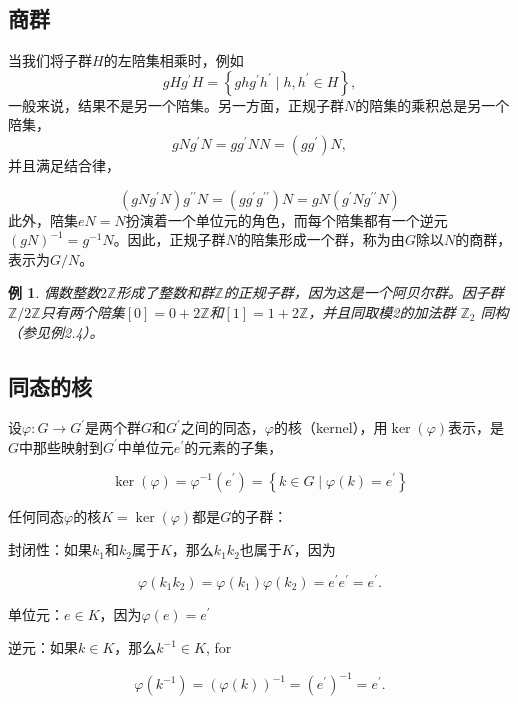 \documentclass[hyperref,UTF8]{ctexbook}
\newtheorem{eg}{例}[chapter]
\begin{document}
\subsection{商群}
当我们将子群$H$的左陪集相乘时，例如
$$
g H g^{\prime} H=\left\{g h g^{\prime} h^{\prime} \mid h, h^{\prime} \in H\right\},
$$
一般来说，结果不是另一个陪集。另一方面，正规子群$N$的陪集的乘积总是另一个陪集，
$$
g N g^{\prime} N=g g^{\prime} N N=\left(g g^{\prime}\right) N,
$$
并且满足结合律，

$$
\left(g N g^{\prime} N\right) g^{\prime \prime} N=\left(g g^{\prime} g^{\prime \prime}\right) N=g N\left(g^{\prime} N g^{\prime \prime} N\right)
$$
此外，陪集$e N=N$扮演着一个单位元的角色，而每个陪集都有一个逆元 $(g N)^{-1}=g^{-1} N$。因此，正规子群$N$的陪集形成一个群，称为由$G$除以$N$的商群，表示为$G / N$。
\begin{eg}
    偶数整数$2 \mathbb{Z}$形成了整数和群$\mathbb{Z}$的正规子群，因为这是一个阿贝尔群。因子群$\mathbb{Z} / 2 \mathbb{Z}$只有两个陪集$[0]=0+2 \mathbb{Z}$和$[1]=1+2 \mathbb{Z}$，并且同取模2的加法群 $\mathbb{Z}_{2}$  同构（参见例2.4）。
\end{eg}

\subsection{同态的核}
设$\varphi: G \rightarrow G^{\prime}$是两个群$G$和$G^{\prime}$之间的同态，$\varphi$的核（kernel），用$\operatorname{ker}(\varphi)$表示，是$G$中那些映射到$G^{\prime}$中单位元$e^{\prime}$的元素的子集，

$$
\operatorname{ker}(\varphi)=\varphi^{-1}\left(e^{\prime}\right)=\left\{k \in G \mid \varphi(k)=e^{\prime}\right\}
$$

任何同态$\varphi$的核$K=\operatorname{ker}(\varphi)$都是$G$的子群：

封闭性：如果$k_{1}$和$k_{2}$属于$K$，那么$k_{1} k_{2}$也属于$K$，因为

$$
\varphi\left(k_{1} k_{2}\right)=\varphi\left(k_{1}\right) \varphi\left(k_{2}\right)=e^{\prime} e^{\prime}=e^{\prime} .
$$

单位元：$e \in K$，因为$\varphi(e)=e^{\prime}$

逆元：如果$k \in K$，那么$k^{-1} \in K$, for

$$
\varphi\left(k^{-1}\right)=(\varphi(k))^{-1}=\left(e^{\prime}\right)^{-1}=e^{\prime} .
$$
\end{document}
